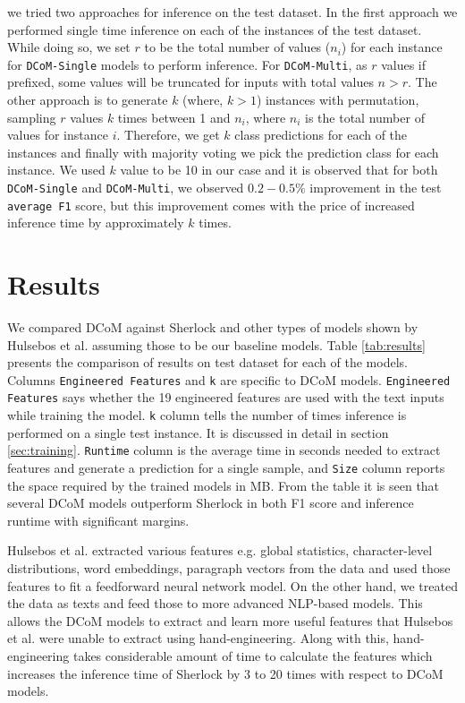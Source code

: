 \documentclass{article}
\begin{document}
we tried two approaches for inference on the test dataset. In the first approach we performed single time inference on each of the instances of the test dataset. While doing so, we set $r$ to be the total number of values ($n_i$) for each instance for \texttt{DCoM-Single} models to perform inference. For \texttt{DCoM-Multi}, as $r$ values if prefixed, some values will be truncated for inputs with total values $n > r$. The other approach is to generate $k$ (where, $k > 1$) instances with permutation, sampling $r$ values $k$ times between 1 and $n_i$, where $n_i$ is the total number of values for instance $i$. Therefore, we get $k$ class predictions for each of the instances and finally with majority voting we pick the prediction class for each instance. We used $k$ value to be 10 in our case and it is observed that for both \texttt{DCoM-Single} and \texttt{DCoM-Multi}, we observed $0.2-0.5\%$ improvement in the test \texttt{average F1} score, but this improvement comes with the price of increased inference time by approximately $k$ times. 

\section{Results}
\label{sec:results}

We compared DCoM against Sherlock and other types of models shown by Hulsebos et al. \cite{Hulsebos} assuming those to be our baseline models. Table \ref{tab:results} presents the comparison of results on test dataset for each of the models. Columns \texttt{Engineered Features} and \texttt{k} are specific to DCoM models. \texttt{Engineered Features} says whether the 19 engineered features are used with the text inputs while training the model. \texttt{k} column tells the number of times inference is performed on a single test instance. It is discussed in detail in section \ref{sec:training}. \texttt{Runtime} column is the average time in seconds needed to extract features and generate a prediction for a single sample, and \texttt{Size} column reports the space required by the trained models in MB. From the table it is seen that several DCoM models outperform Sherlock \cite{Hulsebos} in both F1 score and inference runtime with significant margins. 

Hulsebos et al. \cite{Hulsebos} extracted various features e.g. global statistics, character-level distributions, word embeddings, paragraph vectors from the data and used those features to fit a feedforward neural network model. On the other hand, we treated the data as texts and feed those to more advanced NLP-based models. This allows the DCoM models to extract and learn more useful features that Hulsebos et al. \cite{Hulsebos} were unable to extract using hand-engineering. Along with this, hand-engineering takes considerable amount of time to calculate the features which increases the inference time of Sherlock \cite{Hulsebos} by 3 to 20 times with respect to DCoM models.
\end{document}
